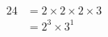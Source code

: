 \documentclass[preview]{standalone}
\begin{document}
\begin{align*}
24 &= 2 \times 2 \times 2 \times 3 \\ &= 2^3 \times 3^1
\end{align*}
\end{document}
